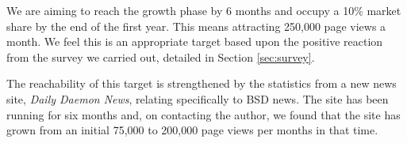 We are aiming to reach the growth phase by 6 months and occupy a 10\% market share by the end of the first year.  This means attracting 250,000 page views a month.  We feel this is an appropriate target based upon the positive reaction from the survey we carried out, detailed in Section \ref{sec:survey}.

The reachability of this target is strengthened by the statistics from a new news site, \emph{Daily Daemon News}, relating specifically to BSD news.  The site has been running for six months and, on contacting the author, we found that the site has grown from an initial 75,000 to 200,000 page views per months in that time.






